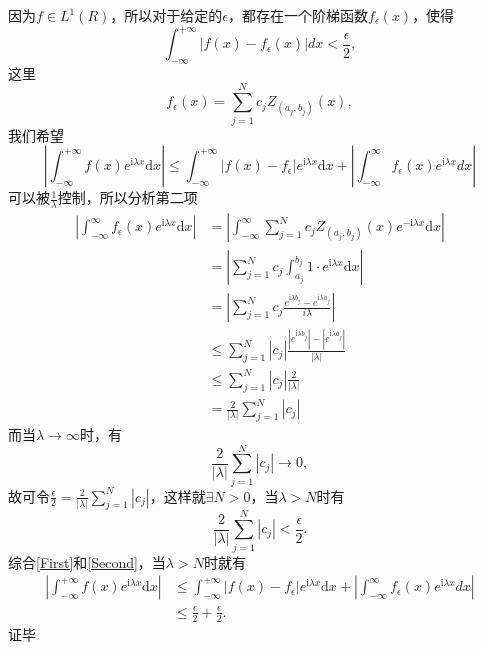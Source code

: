 \documentclass{lzureport}
\begin{document}
因为$f\in L^1(R)$，所以对于给定的$\epsilon$，都存在一个阶梯函数$f_{\epsilon}(x)$，使得
\begin{equation}\label{First}
\int_{-\infty}^{+\infty}|f(x)-f_{\epsilon}(x)|dx<\frac{\epsilon}{2},
\end{equation}
这里
$$
f_{\epsilon}(x)=\sum_{j=1}^{N}c_jZ_{(a_j,b_j)}(x),
$$
我们希望
$$
|\int_{-\infty}^{+\infty}f(x)e^{\mathrm{i}\lambda x}\mathrm{d}x|\leq \int_{-\infty}^{+\infty}|f(x)-f_{\epsilon}|e^{\mathrm{i}\lambda x}\mathrm{d}x+|\int_{-\infty}^{\infty}f_{\epsilon}(x)e^{\mathrm{i}\lambda x}dx|
$$
可以被$\frac{1}{\lambda}$控制，所以分析第二项
\begin{equation*}
	\begin{aligned}
	|\int_{-\infty}^{\infty}f_{\epsilon}(x)e^{\mathrm{i}\lambda x}\mathrm{d}x|&=|\int_{-\infty}^{\infty}\sum_{j=1}^{N}c_jZ_{(a_j,b_j)}(x)e^{-\mathrm{i}\lambda x}\mathrm{d}x|\\	
	&=|\sum_{j=1}^{N}c_j\int_{a_j}^{b_j}1\cdot e^{\mathrm{i}\lambda x}\mathrm{d}x|\\
	&=|\sum_{j=1}^{N}c_j\frac{e^{\mathrm{i}\lambda b_j}-e^{\mathrm{i}\lambda a_j}}{i\lambda}|\\
	&\leq \sum_{j=1}^{N}|c_j|\frac{|e^{\mathrm{i}\lambda b_j}|-|e^{\mathrm{i}\lambda a_j}|}{|\lambda|}\\
	&\leq \sum_{j=1}^{N}|c_j|\frac{2}{|\lambda|}\\
	&=\frac{2}{|\lambda|}\sum_{j=1}^{N}|c_j|
    \end{aligned}
\end{equation*}
而当$\lambda\to\infty$时，有
$$
\frac{2}{|\lambda|}\sum_{j=1}^{N}|c_j|\to 0,
$$
故可令$\frac{\epsilon}{2}=\frac{2}{|\lambda|}\sum_{j=1}^{N}|c_j|$，这样就$\exists N>0$，当$\lambda>N$时有
\begin{equation}\label{Second}
\frac{2}{|\lambda|}\sum_{j=1}^{N}|c_j|<\frac{\epsilon}{2}.
\end{equation}
综合\ref{First}和\ref{Second}，当$\lambda>N$时就有
\begin{equation*}
	\begin{aligned}
|\int_{-\infty}^{+\infty}f(x)e^{\mathrm{i}\lambda x}\mathrm{d}x|&\leq \int_{-\infty}^{+\infty}|f(x)-f_{\epsilon}|e^{\mathrm{i}\lambda x}\mathrm{d}x+|\int_{-\infty}^{\infty}f_{\epsilon}(x)e^{\mathrm{i}\lambda x}dx|\\
&\leq \frac{\epsilon}{2}+\frac{\epsilon}{2}.
	\end{aligned}
\end{equation*}
证毕
\end{document}
